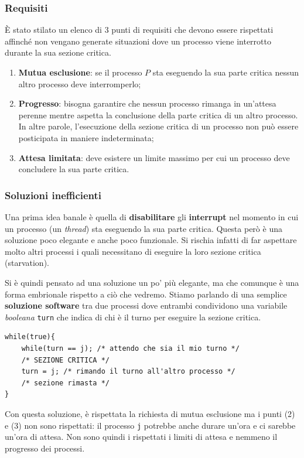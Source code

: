 \subsubsection{Requisiti}\label{CS requisiti}
È stato stilato un elenco di 3 punti di requisiti che devono essere rispettati affinché non vengano generate situazioni dove un processo viene interrotto durante la sua sezione critica.
\begin{enumerate}
    \item \textbf{Mutua esclusione}: se il processo $P$ sta eseguendo la sua parte critica nessun altro processo deve interromperlo;
    \item \textbf{Progresso}: bisogna garantire che nessun processo rimanga in un'attesa perenne mentre aspetta la conclusione della parte critica di un altro processo. In altre parole, l'esecuzione della sezione critica di un processo non può essere posticipata in maniere indeterminata;
    \item \textbf{Attesa limitata}: deve esistere un limite massimo per cui un processo deve concludere la sua parte critica. 
\end{enumerate}
% 
\subsubsection{Soluzioni inefficienti}
Una prima idea banale è quella di \textbf{disabilitare} gli \textbf{interrupt} nel momento in cui un processo (un \textit{thread}) sta eseguendo la sua parte critica. Questa però è una soluzione poco elegante e anche poco funzionale. Si rischia infatti di far aspettare molto altri processi i quali necessitano di eseguire la loro sezione critica (starvation). 

Si è quindi pensato ad una soluzione un po' più elegante, ma che comunque è una forma embrionale rispetto a ciò che vedremo. Stiamo parlando di una semplice \textbf{soluzione software} tra due processi dove entrambi condividono una variabile \textit{booleana} \texttt{turn} che indica di chi è il turno per eseguire la sezione critica.
\begin{lstlisting}
while(true){
    while(turn == j); /* attendo che sia il mio turno */
    /* SEZIONE CRITICA */
    turn = j; /* rimando il turno all'altro processo */
    /* sezione rimasta */
}
\end{lstlisting}
Con questa soluzione, è rispettata la richiesta di mutua esclusione ma i punti (2) e (3) non sono rispettati: il processo \texttt{j} potrebbe anche durare un'ora e ci sarebbe un'ora di attesa. Non sono quindi i rispettati i limiti di attesa e nemmeno il progresso dei processi.
% 
